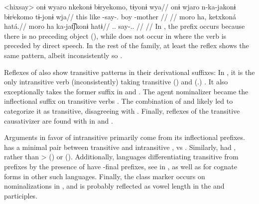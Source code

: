 \pex<hixsay>\hixka
{}
\begingl
\glpreamble onɨ wyaro nkekonɨ bɨryekomo, tɨyonɨ wya//
\gla onɨ wjaro n-ka-jakonɨ bɨrʲekomo tɨ-jonɨ wja//
\glb this like -say-. boy -mother //
\glft {} \parencite[][36]{hixkaryanaderby1985}//
\endgl
{}
\begingl
\glpreamble moro ha, ketxkoná hatá.//
\gla moro ha ka-jat͡ʃkonɨ hatɨ//
\glb {}..  say-.. //
\glft {} \parencite[][14]{derbyshire1965textos}//
\endgl
\xe
In , the prefix  occurs because there is no preceding object (), while does not occur in  where the verb is preceded by direct speech.
In the rest of the family, at least the \trio reflex shows the same pattern, albeit inconsistently so \parencite[267]{triocarlin2004}.

Reflexes of   also show transitive patterns in their derivational suffixes:
In \trio, it is the only intransitive verb (inconsistently) taking transitive  () and  (.) \parencite[263, 169]{triomeira1999}.
It also exceptionally takes the former suffix in \kalina \parencite[82]{courtz2008carib} and \wayana \parencite[258]{wayanatavares2005}.
The agent nominalizer  became the \panare inflectional suffix  on transitive verbs \parencite[184--185]{gildea1998}.
The combination of  and  likely led \textcite[214]{panarepayne2013} to categorize it as transitive, disagreeing with  \textcite[102]{mattei1994diccionario}.
Finally, reflexes of the transitive causativizer  \parencite{gildea2015valency} are found with  in \apalai \parencite[51]{koehn1986apalai} and \waiwai \parencite[52]{waiwaihawkins1998}.

Arguments in favor of intransitive  primarily come from its inflectional prefixes.
\kalina has a minimal pair between transitive   and intransitive  ,   vs   \parencite[288, 45]{courtz2008carib}.
Similarly, \PPek {}  had   , rather than >  (\bakairi) or  (\PXin).
Additionally, languages differentiating transitive from  prefixes by the presence of  \parencite[495]{meira2010origin} have -final prefixes, see \akuriyo in , as well as \textcites[294]{triomeira1999}[195]{wayanatavares2005}[288]{ikpengpacheco2001}[150]{alves2017arara}[168]{hoff1968carib} for cognate forms in other such languages.
Finally, the  class marker  occurs on nominalizations in \kalina {}, and is probably reflected as vowel length in the \trio \parencite[333]{triomeira1999} and \wayana \parencite[196]{wayanatavares2005} participles.

